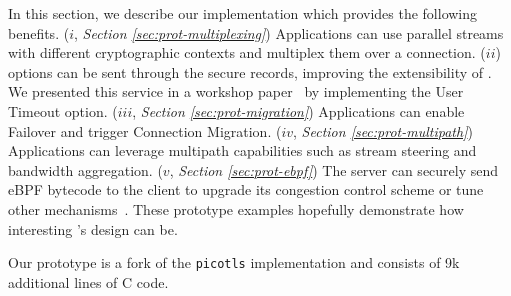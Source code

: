 \label{sec:content}

In this section, we describe our \tcpls implementation which provides the 
following benefits.
($i$, \textit{Section \ref{sec:prot-multiplexing}}) Applications can use 
parallel 
streams with 
different cryptographic 
contexts and multiplex them over a \tcp connection.
($ii$) \tcp options can be sent through the secure \tcpls records, improving 
the extensibility of \tcp. We presented this service in a workshop
paper~\cite{rochet2020tcpls} by implementing the \tcp User Timeout option.
($iii$, \textit{Section \ref{sec:prot-migration}}) Applications can enable 
Failover and 
trigger Connection Migration.
($iv$, \textit{Section \ref{sec:prot-multipath}}) Applications can leverage 
multipath 
capabilities such as stream 
steering %
and bandwidth aggregation.
($v$, \textit{Section \ref{sec:prot-ebpf}}) The server can securely send eBPF 
bytecode to the client 
to upgrade its \tcp congestion control scheme or tune other \tcp 
mechanisms~\cite{brakmo2017tcp,tran2019beyond}. These prototype examples
hopefully demonstrate how interesting \tcpls's design can be.

Our \tcpls prototype is a fork of the \texttt{picotls}  implementation 
and consists of 9k additional lines of C code.

